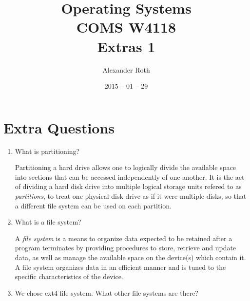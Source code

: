 \documentclass[]{article}
\begin{document}
\newtheorem{thm}{Theorem}
\title{Operating Systems \\ COMS W4118 \\ Extras 1}
\author{Alexander Roth}
\date{2015 -- 01 -- 29}
\maketitle

\section*{Extra Questions}
\begin{enumerate}
\item What is partitioning?

Partitioning a hard drive allows one to logically divide the available space
into sections that can be accessed independently of one another. It is the act
of dividing a hard disk drive into multiple logical storage units refered to as
\emph{partitions}, to treat one physical disk drive as if it were multiple
disks, so that a different file system can be used on each partition.

\item What is a file system?

A \emph{file system} is a means to organize data expected to be retained after a
program terminates by providing procedures to store, retrieve and update data,
as well as manage the available space on the device(s) which contain it. A file
system organizes data in an efficient manner and is tuned to the specific
characteristics of the device.

\item We chose ext4 file system. What other file systems are there?


\end{enumerate}
\end{document}
